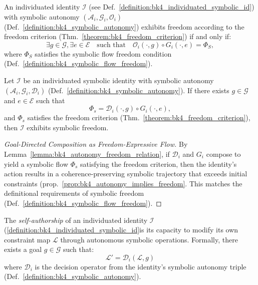 \begin{lemma}
\label{lemma:bk4_autonomy_freedom_relation}
An individuated identity $\mathcal{I}$ (see Def.~\ref{definition:bk4_individuated_symbolic_id}) with symbolic autonomy $(\mathcal{A}_i, \mathcal{G}_i, \mathcal{O}_i)$ (Def.~\ref{definition:bk4_symbolic_autonomy}) exhibits freedom according to the freedom criterion (Thm.~\ref{theorem:bk4_freedom_criterion}) if and only if:
\[
\exists g \in \mathcal{G}, \exists e \in \mathcal{E} \quad \text{such that} \quad \mathcal{O}_i(\cdot, g) \circ G_i(\cdot, e) = \Phi_S,
\]
where $\Phi_S$ satisfies the symbolic flow freedom condition (Def.~\ref{definition:bk4_symbolic_flow_freedom}).
\end{lemma}

\begin{proposition}
\label{prop:bk4_autonomy_implies_freedom}
Let $\mathcal{I}$ be an individuated symbolic identity with symbolic autonomy $(\mathcal{A}_i, \mathcal{G}_i, \mathcal{D}_i)$ (Def.~\ref{definition:bk4_symbolic_autonomy}). If there exists $g \in \mathcal{G}$ and $e \in \mathcal{E}$ such that
\[
\Phi_s = \mathcal{D}_i(\cdot, g) \circ G_i(\cdot, e),
\]
and $\Phi_s$ satisfies the freedom criterion (Thm.~\ref{theorem:bk4_freedom_criterion}), then $\mathcal{I}$ exhibits symbolic freedom.
\end{proposition}
\begin{proof}[Goal-Directed Composition as Freedom-Expressive Flow]
\label{proof:bk4_goal_directed_composition_flow}
By Lemma~\ref{lemma:bk4_autonomy_freedom_relation}, if $\mathcal{D}_i$ and $G_i$ compose to yield a symbolic flow $\Phi_s$ satisfying the freedom criterion, then the identity's action results in a coherence-preserving symbolic trajectory that exceeds initial constraints (prop.~\ref{prop:bk4_autonomy_implies_freedom}. This matches the definitional requirements of symbolic freedom (Def.~\ref{definition:bk4_symbolic_flow_freedom}).
\end{proof}

\begin{definition}
\label{definition:bk4_self_authorship}
The \emph{self-authorship} of an individuated identity $\mathcal{I}$ (\ref{definition:bk4_individuated_symbolic_id}is its capacity to modify its own constraint map $\mathcal{L}$ through autonomous symbolic operations. Formally, there exists a goal $g \in \mathcal{G}$ such that:
\[
\mathcal{L}' = \mathcal{D}_i(\mathcal{L}, g)
\]
where $\mathcal{D}_i$ is the decision operator from the identity's symbolic autonomy triple (Def.~\ref{definition:bk4_symbolic_autonomy}).
\end{definition}

